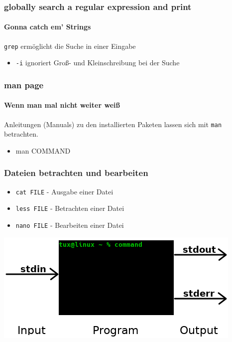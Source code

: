 \documentclass[12pt,utf8]{beamer}
\begin{document}
\begin{frame}
\frametitle{\textcolor{FOSSAGalert}{g}lobally search a \textcolor{FOSSAGalert}{r}egular \textcolor{FOSSAGalert}{e}xpression and \textcolor{FOSSAGalert}{p}rint}
\framesubtitle{Gonna catch em' Strings}
\texttt{grep} ermöglicht die Suche in einer Eingabe
\begin{itemize}
	\item \texttt{-i} ignoriert Groß- und Kleinschreibung bei der Suche
\end{itemize}
\end{frame}

\begin{frame}
\frametitle{man page}
\framesubtitle{Wenn man mal nicht weiter weiß}
Anleitungen (Manuals) zu den installierten Paketen lassen sich mit \texttt{man} betrachten.
\begin{itemize}
	\item man COMMAND
\end{itemize}
\end{frame}



\begin{frame}
\frametitle{Dateien betrachten und bearbeiten}
\begin{itemize}
	\item \texttt{cat FILE} - Ausgabe einer Datei
	\item \texttt{less FILE} - Betrachten einer Datei
	\item \texttt{nano FILE} - Bearbeiten einer Datei
\end{itemize}
\end{frame}

\begin{frame}
	\centering\includegraphics[scale=0.65]{res/IOE}
\end{frame}

\begin{frame}
	\Huge\centering{$|$~~~$>$}
\end{frame}
\end{document}
